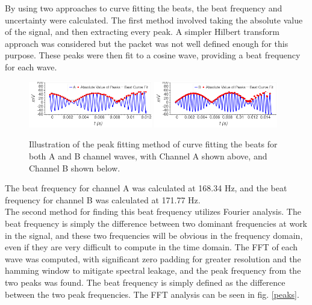 \documentclass[aps,prl,reprint]{revtex4-2}
\begin{document}
By using two approaches to curve fitting the beats, the beat frequency and
uncertainty were calculated. The first method involved taking the absolute
value of the signal, and then extracting every peak. A simpler Hilbert
transform approach was considered but the packet was not well defined enough
for this purpose. These peaks were then fit to a cosine wave, providing a
beat frequency for each wave. 

\begin{figure}[h]
\includegraphics[width=0.48\textwidth]{../Images/l6_channel_A_peaks_fit.png}
\includegraphics[width=0.48\textwidth]{../Images/l6_channel_B_peaks_fit.png}
\caption{\label{peaks_fits} Illustration of the peak fitting method of
curve fitting the beats for both A and B channel waves, with Channel A shown
above, and Channel B shown below.}
\end{figure}

The beat frequency for channel A was calculated at 168.34 Hz, and
the beat frequency for channel B was calculated at 171.77 Hz. \\

The second method for finding this beat frequency utilizes Fourier analysis.
The beat frequency is simply the difference between two dominant frequencies
at work in the signal, and these two frequencies will be obvious in the 
frequency domain, even if they are very difficult to compute in the time 
domain. The FFT of each wave was computed, with significant zero padding for
greater resolution and the hamming window to mitigate spectral leakage,
and the peak frequency from the two peaks was found.
The beat frequency is simply defined as the difference between the two peak
frequencies. The FFT analysis can be seen in fig. \ref{peaks}.
\end{document}
